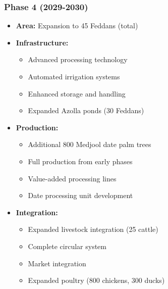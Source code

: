 \subsubsection{Phase 4 (2029-2030)}
\begin{itemize}
    \item \textbf{Area:} Expansion to 45 Feddans (total)
    \item \textbf{Infrastructure:}
    \begin{itemize}
        \item Advanced processing technology
        \item Automated irrigation systems
        \item Enhanced storage and handling
        \item Expanded Azolla ponds (30 Feddans)
    \end{itemize}
    \item \textbf{Production:}
    \begin{itemize}
        \item Additional 800 Medjool date palm trees
        \item Full production from early phases
        \item Value-added processing lines
        \item Date processing unit development
    \end{itemize}
    \item \textbf{Integration:}
    \begin{itemize}
        \item Expanded livestock integration (25 cattle)
        \item Complete circular system
        \item Market integration
        \item Expanded poultry (800 chickens, 300 ducks)
    \end{itemize}
\end{itemize}

